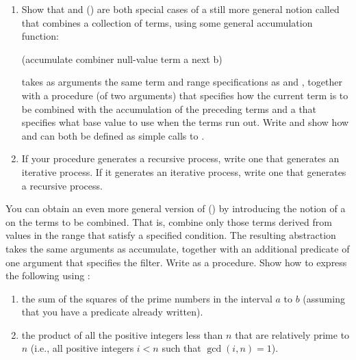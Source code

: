 \begin{exercise}
	\label{Exercise 1.32}
	\begin{enumerate}[label = \alph*., leftmargin = *]

		\item
			Show that  and  () are both special cases of a still more general notion called  that combines a collection of terms, using some general accumulation function:
			\begin{scheme}
			  (accumulate combiner null-value term a next b)
			\end{scheme}

			 takes as arguments the same term and range specifications as  and , together with a  procedure (of two arguments) that specifies how the current term is to be combined with the accumulation of the preceding terms and a  that specifies what base value to use when the terms run out.
			Write  and show how  and  can both be defined as simple calls to .

		\item
			If your  procedure generates a recursive process, write one that generates an iterative process.
			If it generates an iterative process, write one that generates a recursive process.

	\end{enumerate}
\end{exercise}



\begin{exercise}
	\label{Exercise 1.33}
	You can obtain an even more general version of  () by introducing the notion of a  on the terms to be combined.
	That is, combine only those terms derived from values in the range that satisfy a specified condition.
	The resulting  abstraction takes the same arguments as accumulate, together with an additional predicate of one argument that specifies the filter.
	Write  as a procedure.
	Show how to express the following using :
	\begin{enumerate}[label = \alph*., leftmargin = *]

		\item
			the sum of the squares of the prime numbers in the interval \( a \) to \( b \) (assuming that you have a  predicate already written).

		\item
			the product of all the positive integers less than \( n \) that are relatively prime to \( n \) (i.e., all positive integers \( i < n \) such that \( \gcd(i, n) = 1 \)).

	\end{enumerate}
\end{exercise}
